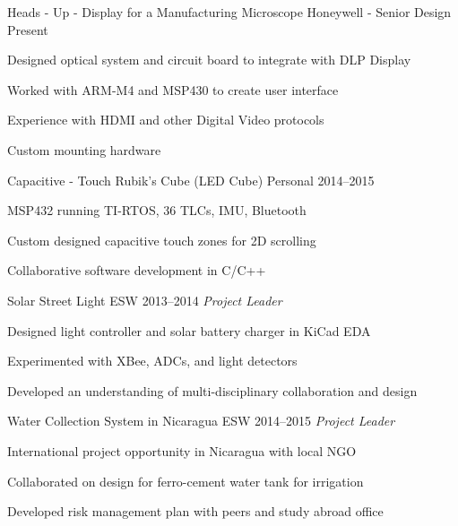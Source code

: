 \documentclass[]{friggeri-cv} %
\begin{document}
\begin{entrylist}
\entryFourItem
{Heads - Up - Display for a Manufacturing Microscope}
{Honeywell - Senior Design}
{Present}
{\begin{itemizenosep}
	\item Designed optical system and circuit board to integrate with DLP Display
	\item Worked with ARM-M4 and MSP430 to create user interface
	\item Experience with HDMI and other Digital Video protocols
	\item Custom mounting hardware
\end{itemizenosep}}
\entryFourItem
{Capacitive - Touch Rubik's Cube (LED Cube)}
{Personal}
{2014--2015}
{\begin{itemizenosep}
	\item MSP432 running TI-RTOS, 36 TLCs, IMU, Bluetooth
	\item Custom designed capacitive touch zones for 2D scrolling
	\item Collaborative software development in C/C++ 
\end{itemizenosep}}
\entry
{Solar Street Light}
{ESW}
{2013--2014}
{\emph{Project Leader}}
{\begin{itemizenosep}
	\item Designed light controller and solar battery charger in KiCad EDA
	\item Experimented with XBee, ADCs, and light detectors
	\item Developed an understanding of multi-disciplinary collaboration and design
\end{itemizenosep}}
\entry
{Water Collection System in Nicaragua}
{ESW}
{2014--2015}
{\emph{Project Leader}}
{\begin{itemizenosep}
	\item International project opportunity in Nicaragua with local NGO
	\item Collaborated on design for ferro-cement water tank for irrigation
	\item Developed risk management plan with peers and study abroad office
\end{itemizenosep}}

\end{entrylist}
\end{document}
